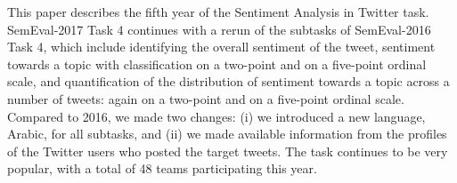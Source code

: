 This paper describes the fifth year of the Sentiment Analysis in Twitter task. SemEval-2017 Task 4 continues with a rerun of the subtasks of SemEval-2016 Task 4, which include identifying the overall sentiment of the tweet, sentiment towards a topic with classification on a two-point and on a five-point ordinal scale, and quantification of the distribution of sentiment towards a topic across a number of tweets: again on a two-point and on a five-point ordinal scale. Compared to 2016, we made two changes: (i) we introduced a new language, Arabic, for all subtasks, and (ii) we made available information from the profiles of the Twitter users who posted the target tweets. The task continues to be very popular, with a total of 48 teams participating this year.
